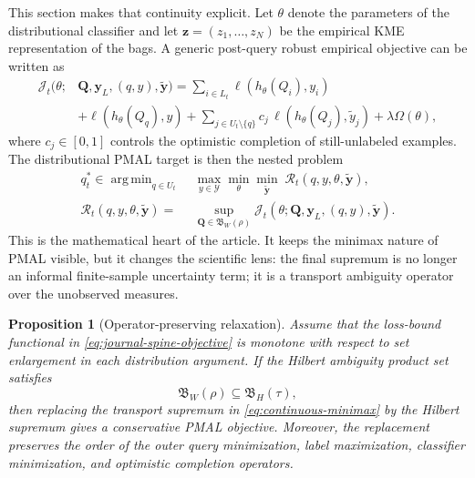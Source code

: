 \documentclass[10pt,journal]{IEEEtran}
\newtheorem{proposition}{Proposition}
\DeclareMathOperator*{\argmin}{arg\,min}
\newcommand{\Ycal}{\mathcal{Y}}
\newcommand{\Jcal}{\mathcal{J}}
\begin{document}
This section makes that continuity explicit. Let $\theta$ denote the parameters of the distributional classifier and let $\mathbf z=(z_1,\ldots,z_N)$ be the empirical KME representation of the bags. A generic post-query robust empirical objective can be written as
\begin{equation}
\label{eq:journal-spine-objective}
\begin{aligned}
\Jcal_t(\theta;&\mathbf Q,\mathbf y_L,(q,y),\tilde{\mathbf y})
=\sum_{i\in L_t}\ell(h_\theta(Q_i),y_i)\\
&+\ell(h_\theta(Q_q),y)
+\sum_{j\in U_t\setminus\{q\}} c_j\,
  \ell(h_\theta(Q_j),\tilde y_j)
+\lambda\Omega(\theta),
\end{aligned}
\end{equation}
where $c_j\in[0,1]$ controls the optimistic completion of still-unlabeled examples. The distributional PMAL target is then the nested problem
\begin{equation}
\label{eq:continuous-minimax}
\begin{aligned}
q_t^*\in\argmin_{q\in U_t}\;&
\max_{y\in\Ycal}\min_{\theta}
\min_{\tilde{\mathbf y}}\;
\mathcal R_t(q,y,\theta,\tilde{\mathbf y}),\\[-0.2em]
\mathcal R_t(q,y,\theta,\tilde{\mathbf y})=
&\sup_{\mathbf Q\in\mathfrak B_W(\rho)}
\Jcal_t(\theta;\mathbf Q,\mathbf y_L,(q,y),\tilde{\mathbf y}).
\end{aligned}
\end{equation}
This is the mathematical heart of the article. It keeps the minimax nature of PMAL visible, but it changes the scientific lens: the final supremum is no longer an informal finite-sample uncertainty term; it is a transport ambiguity operator over the unobserved measures.

\begin{proposition}[Operator-preserving relaxation]
\label{prop:operator-preserving-relaxation}
Assume that the loss-bound functional in \eqref{eq:journal-spine-objective} is monotone with respect to set enlargement in each distribution argument. If the Hilbert ambiguity product set satisfies
\begin{equation}
\label{eq:product-inclusion-spine}
\mathfrak B_W(\rho)\subseteq \mathfrak B_H(\tau),
\end{equation}
then replacing the transport supremum in \eqref{eq:continuous-minimax} by the Hilbert supremum gives a conservative PMAL objective. Moreover, the replacement preserves the order of the outer query minimization, label maximization, classifier minimization, and optimistic completion operators.
\end{proposition}
\end{document}
